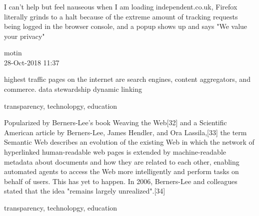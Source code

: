 \documentclass[aspectratio=169]{beamer}
\newcommand\blfootnote[1]{%
  \begingroup
  \renewcommand\thefootnote{}\footnote{#1}%
  \addtocounter{footnote}{-1}%
  \endgroup
}
\begin{document}
\begin{frame}
\frametitle{}
\epigraph{I can't help but feel nauseous when I am loading independent.co.uk, Firefox literally grinds to a halt because of the extreme amount of tracking requests being logged in the browser console, and a popup shows up and says "We value your privacy"}{motin \\
28-Oct-2018 11:37}
\end{frame}




\begin{frame}
highest traffic pages on the internet are search engines, content aggregators, and commerce.
data stewardship
dynamic linking
\end{frame}



\begin{frame}
transparency, technolopgy, education

Popularized by Berners-Lee's book Weaving the Web[32] and a Scientific American article by Berners-Lee, James Hendler, and Ora Lassila,[33] the term Semantic Web describes an evolution of the existing Web in which the network of hyperlinked human-readable web pages is extended by machine-readable metadata about documents and how they are related to each other, enabling automated agents to access the Web more intelligently and perform tasks on behalf of users. This has yet to happen. In 2006, Berners-Lee and colleagues stated that the idea "remains largely unrealized".[34]


\end{frame}



\begin{frame}
transparency, technolopgy, education
\end{frame}


{
%
\begin{frame}

\end{frame}
}
\end{document}
